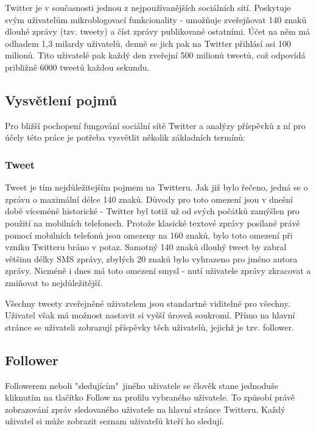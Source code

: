 \documentclass[thesis=B,czech]{FITthesis}[2012/06/26]
\begin{document}
	Twitter je v současnosti jednou z nejpoužívanějších sociálních sítí. Poskytuje svým uživatelům mikroblogovací funkcionality - umožňuje zveřejňovat 140 znaků dlouhé zprávy (tzv. tweety) a číst zprávy publikované ostatními. Účet na něm má odhadem 1,3 milardy uživatelů, denně se jich pak na Twitter přihlásí asi 100 milionů\cite{twitter-stats}. Tito uživatelé pak každý den zveřejní 500 milionů tweetů, což odpovídá približně 6000 tweetů každou sekundu\cite{twitter-stats-2}. 

\subsection{Vysvětlení pojmů}
Pro bližší pochopení fungování sociální sítě Twitter a analýzy příspěvků z ní pro účely této práce je potřeba vysvětlit několik základních termínů:

\subsubsection{Tweet}

Tweet je tím nejdůležitejším pojmem na Twitteru. Jak již bylo řečeno, jedná se o zprávu o maximální délce 140 znaků. Důvody pro toto omezení jsou v dnešní době víceméně historické - Twitter byl totiž už od svých počátků zamýšlen pro použití na mobilních telefonech. Protože klasické textové zprávy posílané právě pomocí mobilních telefonů jsou omezeny na 160 znaků, bylo toto omezení při vzniku Twitteru bráno v potaz. Samotný 140 znaků dlouhý tweet by zabral většinu délky SMS zprávy, zbylých 20 znaků bylo vyhrazeno pro jméno autora zprávy\cite{twitter-140}. Nicméně i dnes má toto omezení smysl - nutí uživatele zprávy zkracovat a zmiňovat to nejdůležitější. 

Všechny tweety zveřejněné uživatelem jsou standartně viditelné pro všechny. Uživatel však má možnost nastavit si vyšší úroveň soukromí. Přímo na hlavní stránce se uživateli zobrazují příspěvky těch uživatelů, jejichž je tzv. follower. 

\subsection{Follower}

	Followerem neboli "sledujícím"\ jiného uživatele se člověk stane jednoduše kliknutím na tlačítko Follow na profilu vybraného uživatele. To způsobí právě zobrazování zpráv sledovaného uživatele na hlavní stránce Twitteru. Každý uživatel si může zobrazit seznam uživatelů kteří ho sledují. 
\end{document}
